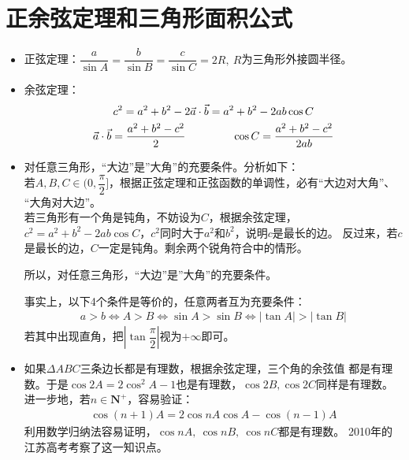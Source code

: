 \section{正余弦定理和三角形面积公式}
\begin{itemize}[leftmargin=\inteval{\myitemleftmargin}pt,itemsep=
   \inteval{\myitemitempsep}pt,topsep=\inteval{\myitemtopsep}pt]
\item 正弦定理：$ \dfrac{a}{\sin A}=\dfrac{b}{\sin B}=
\dfrac{c}{\sin C} =2R,\ R $为三角形外接圆半径。

\item 余弦定理：
\begin{gather*}
    c^2=a^2+b^2-2\vec{a}\cdot\vec{b}
    =a^2+b^2-2ab\cos C  \\
    \vec{a}\cdot\vec{b}=\dfrac{a^2+b^2-c^2}{2} 
    \hspace{1.5cm}     \cos C=\dfrac{a^2+b^2-c^2}{2ab}  
\end{gather*}

\item 对任意三角形，“大边”是”大角”的充要条件。分析如下：\\
若$ A,B,C\in(0,\dfrac{\pi}{2}] $，根据正弦定理和正弦函数的单调性，必有“大边对大角”、
“大角对大边”。\\
若三角形有一个角是钝角，不妨设为$ C $，根据余弦定理，
$ c^2=a^2+b^2-2ab\cos C $，$ c^2 $同时大于$ a^2 $和$ b^2 $，说明$ c $是最长的边。
反过来，若$ c $是最长的边，$ C $一定是钝角。剩余两个锐角符合中的情形。

所以，对任意三角形，“大边”是”大角”的充要条件。

事实上，以下4个条件是等价的，任意两者互为充要条件：
\begin{align*}
    a>b \Leftrightarrow A>B \Leftrightarrow \sin A>\sin B \Leftrightarrow 
    |\tan A|>|\tan B| 
\end{align*}
若其中出现直角，把$ \left|\tan \dfrac{\pi}{2}\right| $视为$ +\infty $即可。

\item 如果$ \Delta ABC $三条边长都是有理数，根据余弦定理，三个角的余弦值
都是有理数。于是$ \cos2A=2\cos^2A-1 $也是有理数，$ \cos2B,\cos2C $同样是有理数。
进一步地，若$ n\in \textbf{N}^+ $，容易验证：
\begin{align*}
    \cos(n+1)A =2\cos nA\cos A -\cos(n-1)A
\end{align*}
利用数学归纳法容易证明，$ \cos nA,\ \cos nB,\ \cos nC $都是有理数。
2010年的江苏高考考察了这一知识点。


\end{itemize}
